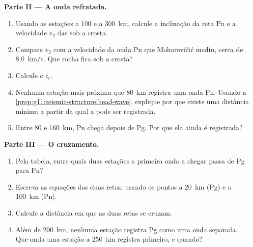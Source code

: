 \begin{problem}
\medskip
\noindent\textbf{Parte II --- A onda refratada.}
\begin{enumerate}[resume]
  \item Usando as estações a 100 e a \qty{300}{km}, calcule a inclinação da
        reta Pn e a velocidade $v_2$ das  sob a crosta.
  \item Compare $v_2$ com a velocidade da onda Pn que Mohorovičić mediu,
        cerca de \qty{8.0}{km/s}. Que rocha fica sob a crosta?
  \item Calcule o  $i_c$.
  \item Nenhuma estação mais próxima que \qty{80}{km} registra uma onda Pn.
        Usando a \cref{prop:g11:seismic-structure:head-wave}, explique por
        que existe uma distância mínima a partir da qual a  pode
        ser registrada.
  \item Entre 80 e \qty{160}{km}, Pn chega depois de Pg. Por que ela ainda é
        registrada?
\end{enumerate}

\medskip
\noindent\textbf{Parte III --- O cruzamento.}
\begin{enumerate}[resume]
  \item Pela tabela, entre quais duas estações a primeira onda a chegar
        passa de Pg para Pn?
  \item Escreva as equações das duas retas, usando os pontos a \qty{20}{km}
        (Pg) e a \qty{100}{km} (Pn).
  \item Calcule a distância em que as duas retas se cruzam.
  \item Além de \qty{200}{km}, nenhuma estação registra Pg como uma onda
        separada. Que onda uma estação a \qty{250}{km} registra primeiro, e
        quando?
\end{enumerate}


\end{problem}
